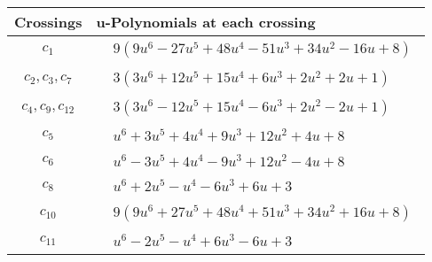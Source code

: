 \documentclass[1p]{elsarticle_modified}
\theoremstyle{definition}
\begin{document}
\begin{tabular}{m{50pt}|m{274pt}}
Crossings & \hspace{64pt}u-Polynomials at each crossing \\
\hline $$\begin{aligned}c_{1}\end{aligned}$$&$\begin{aligned}
&9(9 u^6-27 u^5+48 u^4-51 u^3+34 u^2-16 u+8)
\end{aligned}$\\
\hline $$\begin{aligned}c_{2},c_{3},c_{7}\end{aligned}$$&$\begin{aligned}
&3(3 u^6+12 u^5+15 u^4+6 u^3+2 u^2+2 u+1)
\end{aligned}$\\
\hline $$\begin{aligned}c_{4},c_{9},c_{12}\end{aligned}$$&$\begin{aligned}
&3(3 u^6-12 u^5+15 u^4-6 u^3+2 u^2-2 u+1)
\end{aligned}$\\
\hline $$\begin{aligned}c_{5}\end{aligned}$$&$\begin{aligned}
&u^6+3 u^5+4 u^4+9 u^3+12 u^2+4 u+8
\end{aligned}$\\
\hline $$\begin{aligned}c_{6}\end{aligned}$$&$\begin{aligned}
&u^6-3 u^5+4 u^4-9 u^3+12 u^2-4 u+8
\end{aligned}$\\
\hline $$\begin{aligned}c_{8}\end{aligned}$$&$\begin{aligned}
&u^6+2 u^5- u^4-6 u^3+6 u+3
\end{aligned}$\\
\hline $$\begin{aligned}c_{10}\end{aligned}$$&$\begin{aligned}
&9(9 u^6+27 u^5+48 u^4+51 u^3+34 u^2+16 u+8)
\end{aligned}$\\
\hline $$\begin{aligned}c_{11}\end{aligned}$$&$\begin{aligned}
&u^6-2 u^5- u^4+6 u^3-6 u+3
\end{aligned}$\\
\hline
\end{tabular}\\~\\
\end{document}
